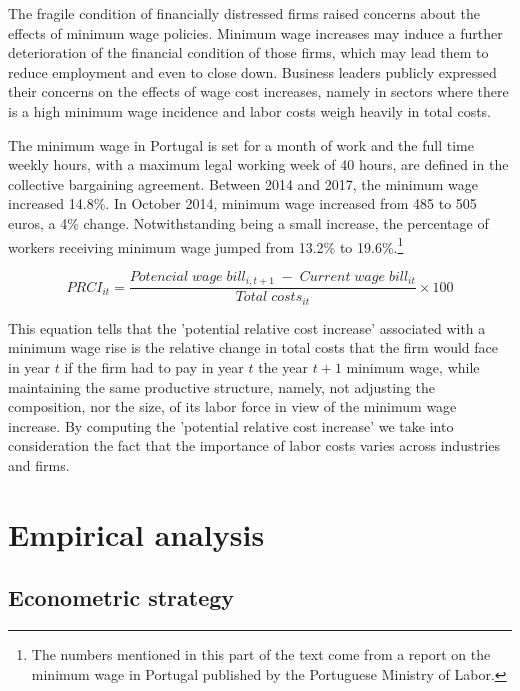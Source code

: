 \documentclass[12pt]{article}
\begin{document}
The fragile condition of financially distressed firms raised concerns about the effects of minimum wage policies. Minimum wage increases may induce a further deterioration of the financial condition of those firms, which may lead them to reduce employment and even to close down. 
Business leaders publicly expressed their concerns on the effects of wage cost increases, namely in sectors where there is a high minimum wage incidence and labor costs weigh heavily in total costs. 

The minimum wage in Portugal is set for a month of work and the full time weekly hours, with a maximum legal working week of 40 hours, are defined in the collective bargaining agreement. Between 2014 and 2017, the minimum wage increased 14.8\%. In October 2014, minimum wage increased from 485 to 505 euros, a 4\% change. Notwithstanding being a small increase, the percentage of workers receiving minimum wage jumped from 13.2\% to 19.6\%.\footnote{The numbers mentioned in this part of the text come from a report on the minimum wage in Portugal published by the Portuguese Ministry of Labor.} 


\begin{equation}\label{eq:prci}
PRCI_{i t} = \frac{Potencial\; wage\; bill_{i,t+1}\; -\; Current\; wage\; bill_{it}}{Total\; costs_{it}} \times 100
\end{equation}

This equation tells that the 'potential relative cost increase' associated with a minimum wage rise is the relative change in total costs that the firm would face in year $t$ if the firm had to pay in year $t$ the year $t+1$ minimum wage, while maintaining the same productive structure, namely, not adjusting the composition, nor the size, of its labor force in view of the minimum wage increase.  
By computing the 'potential relative cost increase' we take into consideration the fact that the importance of labor costs varies across industries and firms.


\section{Empirical analysis} \label{sec:empirical}




\subsection{Econometric strategy}
\end{document}
